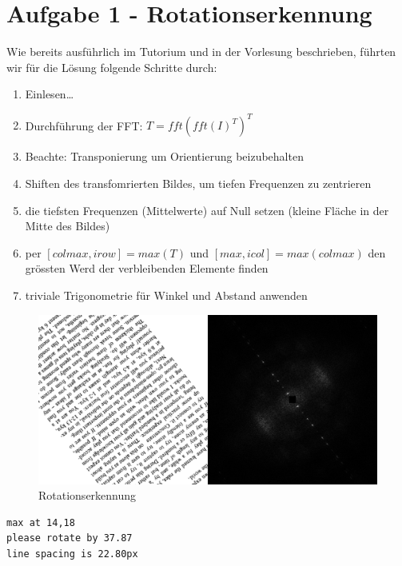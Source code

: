 



\newcommand{\nr}{2}
\lstset{language=matlab}


\section*{Aufgabe 1 - Rotationserkennung}
Wie bereits ausf\"uhrlich im Tutorium und in der Vorlesung beschrieben, f\"uhrten wir f\"ur die
L\"osung folgende Schritte durch:

\begin{enumerate}
\item Einlesen\ldots
\item Durchf\"uhrung der FFT: $T = fft( fft(I)^{T} )^{T}$
\item Beachte: Transponierung um Orientierung beizubehalten
\item Shiften des transfomrierten Bildes, um tiefen Frequenzen zu zentrieren
\item die tiefsten Frequenzen (Mittelwerte) auf Null setzen 
      (kleine Fl\"ache in der Mitte des Bildes)
\item per $[colmax, irow] = max(T)$ und $[max, icol] = max(colmax)$ den gr\"ossten Werd der
      verbleibenden Elemente finden
\item triviale Trigonometrie f\"ur Winkel und Abstand anwenden
\end{enumerate}

\begin{figure}[H]
\begin{center}
\includegraphics[width=150mm]{u04/task1.eps}
\end{center}
\caption{Rotationserkennung}
\end{figure}

\begin{lstlisting}[caption=Ausgabe]
max at 14,18
please rotate by 37.87
line spacing is 22.80px
\end{lstlisting}

